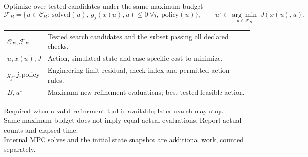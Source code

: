 \begin{frame}[t]{Optimize over tested candidates under the same maximum budget}
\[
\mathcal F_B=\{u\in\mathcal C_B:\ \mathrm{solved}(u),\ g_j(x(u),u)\leq0\ \forall j,\ \mathrm{policy}(u)\},
\qquad
u^\star\in\underset{u\in\mathcal F_B}{\arg\min}\ J(x(u),u).
\]
\small
\begin{tabular}{@{}>{\raggedright\arraybackslash}p{.18\linewidth}>{\raggedright\arraybackslash}p{.74\linewidth}@{}}
$\mathcal C_B,\mathcal F_B$ & Tested search candidates and the subset passing all declared checks. \\
$u,x(u),J$ & Action, simulated state and case-specific cost to minimize. \\
$g_j,j,\mathrm{policy}$ & Engineering-limit residual, check index and permitted-action rules. \\
$B,u^\star$ & Maximum new refinement evaluations; best tested feasible action. \\
\end{tabular}
\medskip
\begin{center}
\end{center}
\par\scriptsize *Required when a valid refinement tool is available; later search may stop.\\
Same maximum budget does not imply equal actual evaluations. Report actual counts and elapsed time.\\
Internal MPC solves and the initial state snapshot are additional work, counted separately.

\end{frame}
